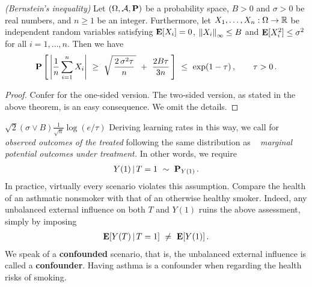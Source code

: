 \begin{theorem}
  \emph{(Bernstein's inequality)}
  Let
  $
  (\Omega,\mathcal{A},\P)
  $ 
  be a probability space, 
  $
  B>0
  $ 
  and
  $
  \sigma>0
  $
  be real numbers,
  and
  $
  n\ge 1
  $
  be an integer.
  Furthermore, 
  let
  $
  X_1,\ldots,X_n
  :
  \Omega
  \to
  \R
  $
  be independent random variables satisfying
  $
  \E[X_i]=0
  $,
  $
  \norm{X_i}_\infty
  \le
  B
  $
  and
  $
  \E[X_i^2]\le \sigma^2
  $
  for all 
  $
  i=1,\ldots,n
  $.
  Then we have
  \begin{gather*}
    \P
    \left[ 
      \,
      \left| 
      \frac{1}{n}
        \sum_{i=1}^{n} 
        X_i
      \right|
      \ 
      \ge
      \ 
      \sqrt{
        \,
        \frac{2\,\sigma^2 \tau}{n}
        \,
      }
      \ 
      +
      \
      \frac{2 B \tau}{3n}
      \,
    \right]
    \ 
    \le
    \ 
    \exp(1-\tau)
    \,
    ,
    \qquad
    \tau>0\,.
  \end{gather*}
\end{theorem}
\begin{proof}
  Confer \cite[Theorem~6.12]{Steinwart2008}
  for the one-sided version. 
  The two-sided version, as stated in the above theorem, is an easy consequence. We omit the details.
\end{proof}
$
\sqrt{2}(\sigma\lor B)\frac{1}{\sqrt{n}}
\log(e/\tau)
$
Deriving learning rates in this way, we call for \textit{observed outcomes of the treated}
following the same distribution as
~\textit{
marginal potential outcomes under treatment.}
In other words, we require
\begin{gather}
  Y(1)\,|\,T=1
  \ 
  \sim 
  \ 
  \P_
  {
  Y(1)
  }
  \,.
\end{gather}
In practice, virtually every scenario violates this assumption.
Compare the health of an asthmatic nonsmoker with that of an otherwise healthy smoker.
  Indeed, any unbalanced external influence on both $T$ and $Y(1)$ ruins the 
above assessment, simply by imposing 
\begin{gather}
  \E[Y(T)\,|\, T=1]\ \neq\  \E[Y(1)]
  \,.
\end{gather}
We speak of a \textbf{confounded} scenario, that is, the unbalanced external influence is called a \textbf{confounder}. Having asthma  is a confounder when regarding the health risks of smoking.



